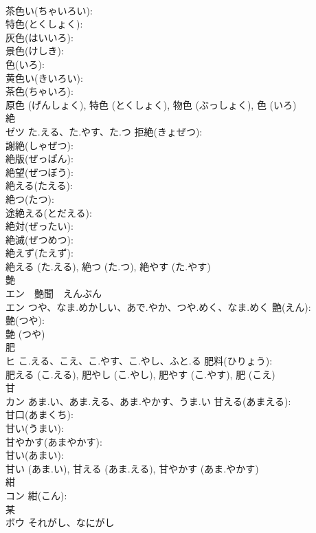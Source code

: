 \documentclass[8pt]{extreport}
\begin{document}
\begin{CJK}{UTF8}{min}
\\	茶色い(ちゃいろい): 
\\	特色(とくしょく): 
\\	灰色(はいいろ): 
\\	景色(けしき): 
\\	色(いろ): 
\\	黄色い(きいろい): 
\\	茶色(ちゃいろ): 
\\	原色 (げんしょく), 特色 (とくしょく), 物色 (ぶっしょく), 色 (いろ)
\\	絶			
\\	ゼツ	た.える、た.やす、た.つ	拒絶(きょぜつ): 
\\	謝絶(しゃぜつ): 
\\	絶版(ぜっぱん): 
\\	絶望(ぜつぼう): 
\\	絶える(たえる): 
\\	絶つ(たつ): 
\\	途絶える(とだえる): 
\\	絶対(ぜったい): 
\\	絶滅(ぜつめつ): 
\\	絶えず(たえず): 
\\	絶える (た.える), 絶つ (た.つ), 絶やす (た.やす)
\\	艶			
\\	エン　艶聞　えんぶん
\\	エン	つや、なま.めかしい、あで.やか、つや.めく、なま.めく	艶(えん): 
\\	艶(つや): 
\\	艶 (つや)
\\	肥			
\\	ヒ	こ.える、こえ、こ.やす、こ.やし、ふと.る	肥料(ひりょう): 
\\	肥える (こ.える), 肥やし (こ.やし), 肥やす (こ.やす), 肥 (こえ)
\\	甘			
\\	カン	あま.い、あま.える、あま.やかす、うま.い	甘える(あまえる): 
\\	甘口(あまくち): 
\\	甘い(うまい): 
\\	甘やかす(あまやかす): 
\\	甘い(あまい): 
\\	甘い (あま.い), 甘える (あま.える), 甘やかす (あま.やかす)
\\	紺			
\\	コン		紺(こん): 
\\	某			
\\	ボウ	それがし、なにがし		

\end{CJK}
\end{document}
